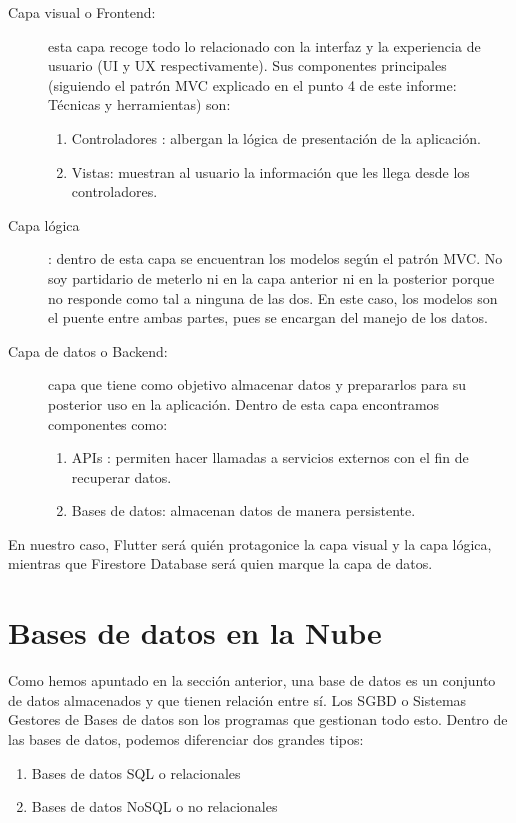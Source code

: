 	\begin{description}
		\item[Capa visual o Frontend:] esta capa recoge todo lo relacionado con la interfaz y la experiencia de usuario (UI y UX respectivamente). Sus componentes principales (siguiendo el patrón MVC explicado en el punto 4 de este informe: Técnicas y herramientas) son:
			\begin{enumerate}
				\item Controladores : albergan la lógica de presentación de la aplicación.
				\item Vistas: muestran al usuario la información que les llega desde los controladores.
			\end{enumerate}
		\item[Capa lógica]: dentro de esta capa se encuentran los modelos según el patrón MVC. No soy partidario de meterlo ni en la capa anterior ni en la posterior porque no responde como tal a ninguna de las dos. En este caso, los modelos son el puente entre ambas partes, pues se encargan del manejo de los datos.
		\item[Capa de datos o Backend:] capa que tiene como objetivo almacenar datos y prepararlos para su posterior uso en la aplicación. Dentro de esta capa encontramos componentes como:
			\begin{enumerate}
				\item APIs : permiten hacer llamadas a servicios externos con el fin de recuperar datos.
				\item Bases de datos: almacenan datos de manera persistente.
			\end{enumerate}
	\end{description}
	
	En nuestro caso, Flutter será quién protagonice la capa visual y la capa lógica, mientras que Firestore Database será quien marque la capa de datos.
	
\section{Bases de datos en la Nube}

	Como hemos apuntado en la sección anterior, una base de datos es un conjunto de datos almacenados y que tienen relación entre sí. Los SGBD o Sistemas Gestores de Bases de datos son los programas que gestionan todo esto. Dentro de las bases de datos, podemos diferenciar dos grandes tipos:
	
	\begin{enumerate}
		\item Bases de datos SQL o relacionales
		\item Bases de datos NoSQL o no relacionales
	\end{enumerate}
	
